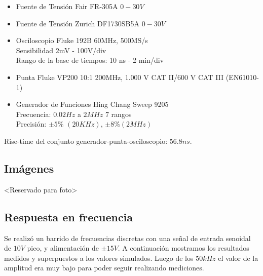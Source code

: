 \documentclass[12pt,a4paper]{article}
\begin{document}
\begin{itemize}
\item Fuente de Tensión Fair FR-305A $0-30V$ 
\item Fuente de Tensión Zurich DF1730SB5A $0-30V$
\item Osciloscopio Fluke 192B 60MHz, 500MS/s\\
Sensibilidad 2mV - 100V/div\\
Rango de la base de tiempos: 10 ns - 2 min/div
\item Punta Fluke VP200 10:1 200MHz, 1.000 V CAT II/600 V CAT III (EN61010-1)
\item Generador de Funciones Hing Chang Sweep 9205\\
Frecuencia: $0.02Hz$ a $2MHz$ 7 rangos\\
Precisión: $\pm 5\%$ $(20KHz)$, $\pm 8\% (2MHz)$ 
\end{itemize}

Rise-time del conjunto generador-punta-osciloscopio: $56.8ns$.

\subsection{Imágenes}

<Reservado para foto>

\subsection{Respuesta en frecuencia}

Se realizó un barrido de frecuencias discretas con una señal de entrada senoidal de $10V$ pico, y alimentación de $\pm 15V$. A continuación mostramos los resultados medidos y superpuestos a los valores simulados. Luego de los $50kHz$ el valor de la amplitud era muy bajo para poder seguir realizando mediciones.\\
\end{document}

